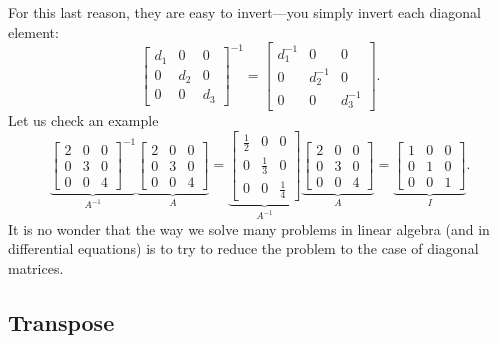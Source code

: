 For this last reason, they are easy to invert---you simply invert each diagonal element:
\begin{equation*}
\begin{bmatrix}
d_1 & 0 & 0 \\
0 & d_2 & 0 \\
0 & 0 & d_3
\end{bmatrix}^{-1}
=
\begin{bmatrix}
d_1^{-1} & 0 & 0 \\
0 & d_2^{-1} & 0 \\
0 & 0 & d_3^{-1}
\end{bmatrix} .
\end{equation*}
Let us check an example
\begin{equation*}
\underbrace{
\begin{bmatrix}
2 & 0 & 0 \\
0 & 3 & 0 \\
0 & 0 & 4
\end{bmatrix}^{-1}
}_{A^{-1}}
\underbrace{
\begin{bmatrix}
2 & 0 & 0 \\
0 & 3 & 0 \\
0 & 0 & 4
\end{bmatrix}
}_{A}
=
\underbrace{
\begin{bmatrix}
\frac{1}{2} & 0 & 0 \\
0 & \frac{1}{3} & 0 \\
0 & 0 & \frac{1}{4}
\end{bmatrix}
}_{A^{-1}}
\underbrace{
\begin{bmatrix}
2 & 0 & 0 \\
0 & 3 & 0 \\
0 & 0 & 4
\end{bmatrix}
}_{A}
=
\underbrace{
\begin{bmatrix}
1 & 0 & 0 \\
0 & 1 & 0 \\
0 & 0 & 1
\end{bmatrix}
}_{I} .
\end{equation*}
It is no wonder that the way we solve many problems in linear algebra
(and in differential equations) is to try to reduce the problem to the
case of diagonal matrices.

\subsection{Transpose}

